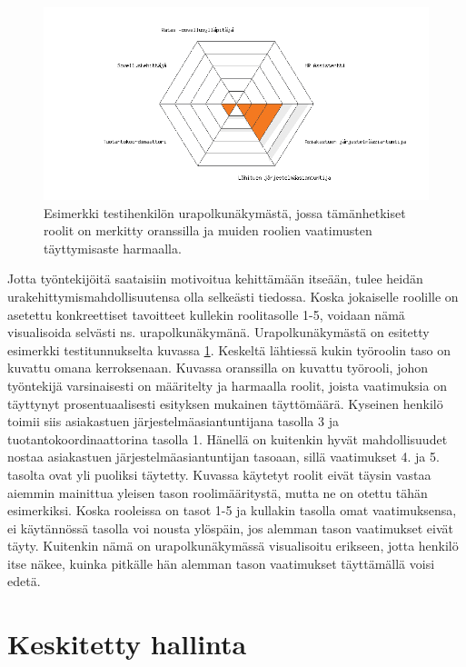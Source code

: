 \documentclass[a4paper,finnish,12pt]{article}
\begin{document}
\begin{figure}[ht]
\centering
\includegraphics[width=1\textwidth]{urapolkuPlot_tst_usr.png}
\caption{Esimerkki testihenkilön urapolkunäkymästä, jossa tämänhetkiset roolit on merkitty oranssilla ja muiden roolien vaatimusten täyttymisaste harmaalla.}
\label{fig:urapolkuspiderweb}
\end{figure}

Jotta työntekijöitä saataisiin motivoitua kehittämään itseään, tulee heidän urakehittymismahdollisuutensa olla selkeästi tiedossa. Koska jokaiselle roolille on asetettu konkreettiset tavoitteet kullekin roolitasolle 1-5, voidaan nämä visualisoida selvästi ns. urapolkunäkymänä. Urapolkunäkymästä on esitetty esimerkki testitunnukselta kuvassa \ref{fig:urapolkuspiderweb}. Keskeltä lähtiessä kukin työroolin taso on kuvattu omana kerroksenaan. Kuvassa oranssilla on kuvattu työrooli, johon työntekijä varsinaisesti on määritelty ja harmaalla roolit, joista vaatimuksia on täyttynyt prosentuaalisesti esityksen mukainen täyttömäärä.  Kyseinen henkilö toimii siis asiakastuen järjestelmäasiantuntijana tasolla 3 ja tuotantokoordinaattorina tasolla 1. Hänellä on kuitenkin hyvät mahdollisuudet nostaa asiakastuen järjestelmäasiantuntijan tasoaan, sillä vaatimukset 4. ja 5. tasolta ovat yli puoliksi täytetty. Kuvassa käytetyt roolit eivät täysin vastaa aiemmin mainittua yleisen tason roolimääritystä, mutta ne on otettu tähän esimerkiksi. Koska rooleissa on tasot 1-5 ja kullakin tasolla omat vaatimuksensa, ei käytännössä tasolla voi nousta ylöspäin, jos alemman tason vaatimukset eivät täyty. Kuitenkin nämä on urapolkunäkymässä visualisoitu erikseen, jotta henkilö itse näkee, kuinka pitkälle hän alemman tason vaatimukset täyttämällä voisi edetä.

\clearpage

\section{Keskitetty hallinta}
\end{document}
